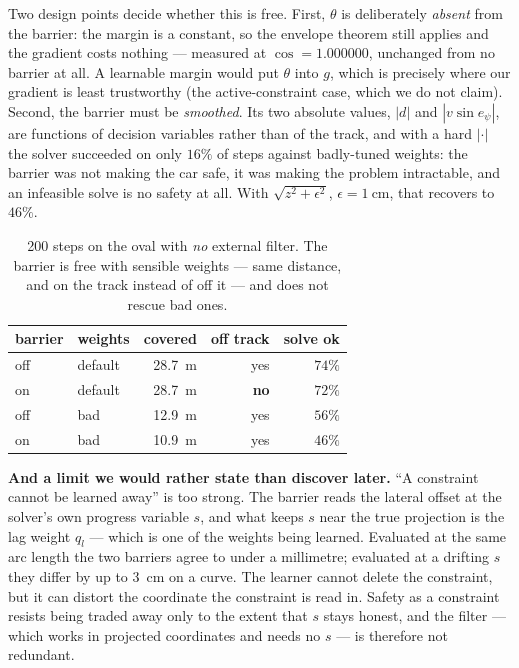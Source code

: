 \documentclass[letterpaper, 10 pt, conference]{ieeeconf}
\begin{document}
Two design points decide whether this is free. First, $\theta$ is deliberately
\emph{absent} from the barrier: the margin is a constant, so the envelope
theorem still applies and the gradient costs nothing --- measured at
$\cos = 1.000000$, unchanged from no barrier at all. A learnable margin would
put $\theta$ into $g$, which is precisely where our gradient is least
trustworthy (the active-constraint case, which we do not claim). Second, the barrier must be
\emph{smoothed}. Its two absolute values, $|d|$ and $|v\sin e_\psi|$, are
functions of decision variables rather than of the track, and with a hard
$|\cdot|$ the solver succeeded on only $16\%$ of steps against badly-tuned
weights: the barrier was not making the car safe, it was making the problem
intractable, and an infeasible solve is no safety at all. With
$\sqrt{z^2+\epsilon^2}$, $\epsilon = \SI{1}{\centi\meter}$, that recovers to
$46\%$.

\begin{table}[t]
  \centering
  \caption{200 steps on the oval with \emph{no} external filter. The barrier is
  free with sensible weights --- same distance, and on the track instead of off
  it --- and does not rescue bad ones.}
  \label{tab:cbfocp}
  \begin{tabular}{llrrr}
    \toprule
    barrier & weights & covered & off track & solve ok \\
    \midrule
    off & default & \SI{28.7}{\meter} & yes & $74\%$ \\
    on  & default & \SI{28.7}{\meter} & \textbf{no} & $72\%$ \\
    off & bad     & \SI{12.9}{\meter} & yes & $56\%$ \\
    on  & bad     & \SI{10.9}{\meter} & yes & $46\%$ \\
    \bottomrule
  \end{tabular}
\end{table}

\textbf{And a limit we would rather state than discover later.} ``A constraint
cannot be learned away'' is too strong. The barrier reads the lateral offset at
the solver's own progress variable $s$, and what keeps $s$ near the true
projection is the lag weight $q_l$ --- which is one of the weights being
learned. Evaluated at the same arc length the two barriers agree to under a
millimetre; evaluated at a drifting $s$ they differ by up to \SI{3}{\centi\meter}
on a curve. The learner cannot delete the constraint, but it can distort the
coordinate the constraint is read in. Safety as a constraint resists being
traded away only to the extent that $s$ stays honest, and the filter --- which
works in projected coordinates and needs no $s$ --- is therefore not redundant.
\end{document}
